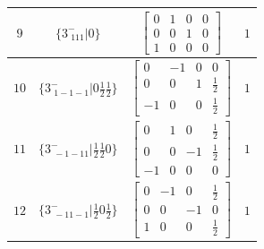\documentclass[fleqn,8pt]{jsarticle}
\begin{document}
\begin{longtable}{cccc}
$ 9 $ & $ \{3^{-}_{\,\,111}|0\} $ & $ \begin{bmatrix} 0 & 1 & 0 & 0 \\ 0 & 0 & 1 & 0 \\ 1 & 0 & 0 & 0 \end{bmatrix} $ & $ 1 $ \\ \hline
$ 10 $ & $ \{3^{-}_{\,\,1-1-1}|0 \frac{1}{2} \frac{1}{2}\} $ & $ \begin{bmatrix} 0 & -1 & 0 & 0 \\ 0 & 0 & 1 & \frac{1}{2} \\ -1 & 0 & 0 & \frac{1}{2} \end{bmatrix} $ & $ 1 $ \\ \hline
$ 11 $ & $ \{3^{-}_{\,\,-1-11}|\frac{1}{2} \frac{1}{2} 0\} $ & $ \begin{bmatrix} 0 & 1 & 0 & \frac{1}{2} \\ 0 & 0 & -1 & \frac{1}{2} \\ -1 & 0 & 0 & 0 \end{bmatrix} $ & $ 1 $ \\ \hline
$ 12 $ & $ \{3^{-}_{\,\,-11-1}|\frac{1}{2} 0 \frac{1}{2}\} $ & $ \begin{bmatrix} 0 & -1 & 0 & \frac{1}{2} \\ 0 & 0 & -1 & 0 \\ 1 & 0 & 0 & \frac{1}{2} \end{bmatrix} $ & $ 1 $ \\
\end{longtable}
\end{document}

